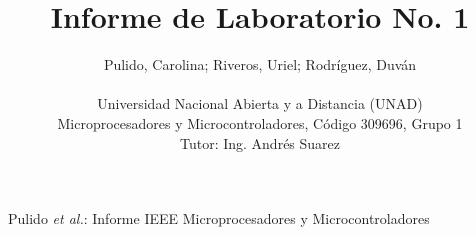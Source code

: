 \documentclass[journal]{IEEEtran}
\begin{document}
\title{Informe de Laboratorio No. 1}
\author{ Pulido, Carolina; Riveros, Uriel; Rodríguez, Duván

~\\
Universidad Nacional Abierta y a Distancia (UNAD)\\
Microprocesadores y Microcontroladores, Código 309696, Grupo 1\\
Tutor: Ing. Andrés Suarez


}

{Pulido \MakeLowercase{\textit{et al.}}: Informe IEEE Microprocesadores y Microcontroladores}

\maketitle



\IEEEpeerreviewmaketitle



\printbibliography

\end{document}
